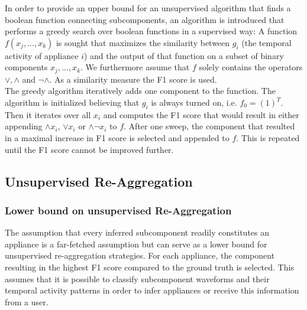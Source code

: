 \begin{description}
In order to provide an upper bound for an unsupervised algorithm that finds a boolean function connecting subcomponents, an algorithm is introduced that performs a greedy search over boolean functions in a supervised way: A function $f(x_j,...,x_k)$ is sought that maximizes the similarity between $g_i$ (the temporal activity of appliance $i$) and the output of that function on a subset of binary components $x_j,... ,x_k$. We furthermore assume that $f$ solely contains the operators $\lor, \land$ and $\neg \land$. As a similarity measure the F1 score is used.\\
The greedy algorithm iteratively adds one component to the function. The algorithm is initialized believing that $g_i$ is always turned on, i.e. $f_0 = (1)^T$. Then it iterates over all $x_i$ and computes the F1 score that would result in either appending $\land x_i$, $\lor x_i$ or $\land \neg x_i$ to $f$. After one sweep, the component that resulted in a maximal increase in F1 score is selected and appended to $f$. This is repeated until the F1 score cannot be improved further.
\end{description}
 
 \subsection{Unsupervised Re-Aggregation}
 \subsubsection{Lower bound on unsupervised Re-Aggregation}
 The assumption that every inferred subcomponent readily constitutes an appliance is a far-fetched assumption but can serve as a lower bound for unsupervised re-aggregation strategies. For each appliance, the component resulting in the highest F1 score compared to the ground truth is selected. This assumes that it is possible to classify subcomponent waveforms and their temporal activity patterns in order to infer appliances or receive this information from a user.
 
